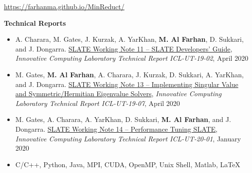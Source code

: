\documentclass[9pt,a4paper]{extarticle}
\begin{document}
{\begin{itemize}
\url{https://farhanma.github.io/MinReduct/}\\
\end{itemize}

\textbf{Technical Reports}
\begin{itemize}
\item
A. Charara, M. Gates, J. Kurzak, A. YarKhan,
\textbf{M. Al Farhan}, D. Sukkari, and J. Dongarra.
\href{http://www.icl.utk.edu/publications/swan-011}
{{SLATE Working Note 11 -- SLATE Developers' Guide}},
\textit{Innovative Computing Laboratory Technical Report ICL-UT-19-02}, April 2020
\item
M. Gates, \textbf{M. Al Farhan}, A. Charara, J. Kurzak, D. Sukkari, A. YarKhan, and J. Dongarra.
\href{http://www.icl.utk.edu/publications/swan-013}
{{SLATE Working Note 13 -- Implementing Singular Value and Symmetric/Hermitian Eigenvalue Solvers}},
\textit{Innovative Computing Laboratory Technical Report ICL-UT-19-07}, April 2020
\item
M. Gates, A. Charara, A. YarKhan, D. Sukkari,
\textbf{M. Al Farhan}, and J. Dongarra.
\href{http://www.icl.utk.edu/publications/swan-014}
{{SLATE Working Note 14 -- Performance Tuning SLATE}},
\textit{Innovative Computing Laboratory Technical Report ICL-UT-20-01}, January 2020
\end{itemize}
}
\bigskip
\bigskip

{
\begin{itemize}
\item
C/C++, Python, Java, MPI, CUDA, OpenMP, Unix Shell, Matlab, \LaTeX
\end{itemize}
}
\bigskip
\bigskip
\end{document}
